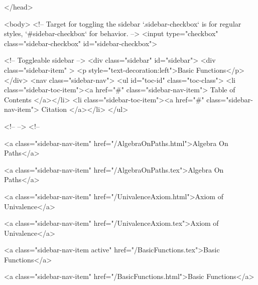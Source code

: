   
</head>




  <body>
    <!-- Target for toggling the sidebar `.sidebar-checkbox` is for regular
     styles, `#sidebar-checkbox` for behavior. -->
<input type="checkbox" class="sidebar-checkbox" id="sidebar-checkbox">

<!-- Toggleable sidebar -->
<div class="sidebar" id="sidebar">
  <div class="sidebar-item" >
    <p style="text-decoration:left">Basic Functions</p>
  </div>
  <nav class="sidebar-nav">
    <ul id="toc-id" class="toc-class">
  <li class="sidebar-toc-item"><a href="#" class="sidebar-nav-item"> Table of Contents </a></li>
  <li class="sidebar-toc-item"><a href="#" class="sidebar-nav-item"> Citation </a></li>
</ul>


    <!--  -->
    <!-- 
      
    
      
    
      
    
      
        
      
    
      
        
          <a class="sidebar-nav-item" href="/AlgebraOnPaths.html">Algebra On Paths</a>
        
      
    
      
        
          <a class="sidebar-nav-item" href="/AlgebraOnPaths.tex">Algebra On Paths</a>
        
      
    
      
        
          <a class="sidebar-nav-item" href="/UnivalenceAxiom.html">Axiom of Univalence</a>
        
      
    
      
        
          <a class="sidebar-nav-item" href="/UnivalenceAxiom.tex">Axiom of Univalence</a>
        
      
    
      
        
          <a class="sidebar-nav-item active" href="/BasicFunctions.tex">Basic Functions</a>
        
      
    
      
        
          <a class="sidebar-nav-item" href="/BasicFunctions.html">Basic Functions</a>
        
      
    
      
        
